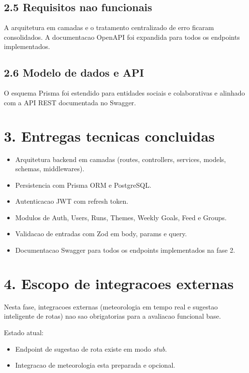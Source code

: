 \documentclass[11pt,a4paper]{article}
\begin{document}
\subsection*{2.5 Requisitos nao funcionais}
A arquitetura em camadas e o tratamento centralizado de erro ficaram consolidados. A documentacao OpenAPI foi expandida para todos os endpoints implementados.

\subsection*{2.6 Modelo de dados e API}
O esquema Prisma foi estendido para entidades sociais e colaborativas e alinhado com a API REST documentada no Swagger.

\section*{3. Entregas tecnicas concluidas}

\begin{itemize}
  \item Arquitetura backend em camadas (routes, controllers, services, models, schemas, middlewares).
  \item Persistencia com Prisma ORM e PostgreSQL.
  \item Autenticacao JWT com refresh token.
  \item Modulos de Auth, Users, Runs, Themes, Weekly Goals, Feed e Groups.
  \item Validacao de entradas com Zod em body, params e query.
  \item Documentacao Swagger para todos os endpoints implementados na fase 2.
\end{itemize}

\section*{4. Escopo de integracoes externas}

Nesta fase, integracoes externas (meteorologia em tempo real e sugestao inteligente de rotas) nao sao obrigatorias para a avaliacao funcional base.

Estado atual:

\begin{itemize}
  \item Endpoint de sugestao de rota existe em modo \textit{stub}.
  \item Integracao de meteorologia esta preparada e opcional.
\end{itemize}
\end{document}
